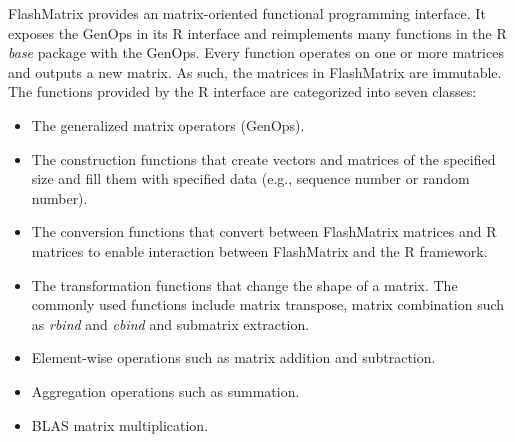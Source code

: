 FlashMatrix provides an matrix-oriented functional programming interface.
It exposes the GenOps in its R interface and reimplements many functions
in the R \textit{base} package with the GenOps. Every function operates on
one or more matrices and outputs a new matrix. As such, the matrices in
FlashMatrix are immutable. The functions provided by the R interface are
categorized into seven classes:
\begin{itemize}
	\item The generalized matrix operators (GenOps).
	\item The construction functions that create vectors and matrices of
		the specified size and fill them with specified data (e.g., sequence
		number or random number).
	\item The conversion functions that convert between FlashMatrix matrices and
		R matrices to enable interaction between FlashMatrix and the R framework.
	\item The transformation functions that change the shape of a matrix.
		The commonly used functions include matrix transpose, matrix combination
		such as \textit{rbind} and \textit{cbind} and submatrix extraction.
	\item Element-wise operations such as matrix addition and subtraction.
	\item Aggregation operations such as summation.
	\item BLAS matrix multiplication.
\end{itemize}




